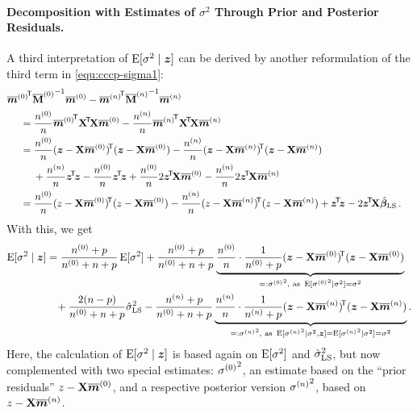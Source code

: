 \paragraph{Decomposition with Estimates of \texorpdfstring{$\sigma^2$}{sigma2} Through Prior and Posterior Residuals.}

A third interpretation of $\operatorname{E}[\sigma^2\mid {\bm z}]$
can be derived by another reformulation of the third term in \eqref{equ:cccp-sigma1}:
\begin{align*}
\lefteqn{
    {\tmz}^\tra {\tMz}^{-1} \tmz
  - {\tmn}^\tra {\tMn}^{-1} \tmn }\hspace*{3ex} \\
&=  \frac{\nz}{n} {\tmz}^\tra \XtX \tmz
  - \frac{\nn}{n} {\tmn}^\tra \XtX \tmn \\
&=  \frac{\nz}{n} (\z - \X\tmz)^\tra (\z - \X\tmz)
  - \frac{\nn}{n} (\z - \X\tmn)^\tra (\z - \X\tmn) \\ & \hspace*{3ex}
  + \frac{\nn}{n} \ztz      - \frac{\nz}{n} \ztz
  + \frac{\nz}{n} 2\ztX\tmz - \frac{\nn}{n} 2\ztX\tmn \\
&=  \frac{\nz}{n} (z - \X\tmz)^\tra (z - \X\tmz)
  - \frac{\nn}{n} (z - \X\tmn)^\tra (z - \X\tmn) %
  + \ztz
  - 2\ztX\bls \,. %
\end{align*}
With this, we get
\begin{align}
\E[\sigma^2\mid \z] &= \frac{\nz + p} {\nz + n + p} \E[\sigma^2]
                      +\frac{\nz + p} {\nz + n + p}
                        \underbrace{\frac{\nz}{n} \cdot \frac{1}{\nz + p}
                                    (\z - \X\tmz)^\tra (\z - \X\tmz)}_{=: {\sigma\uz}^2, \text{ as }
                                                                       \E[{\sigma\uz}^2\mid\sigma^2] = \sigma^2} \nonumber\\ & \hspace*{2ex}
                      +\frac{2(n - p)}{\nz + n + p} \sls
                      -\frac{\nn + p} {\nz + n + p}
                        \underbrace{\frac{\nn}{n} \cdot \frac{1}{\nn + p}
                                    (\z - \X\tmn)^\tra (\z - \X\tmn)}_{=: {\sigma\un}^2, \text{ as }
                                                                       \E[{\sigma\un}^2\mid\sigma^2,\z] = \E[{\sigma\un}^2\mid\sigma^2] = \sigma^2} %
                                                                         .
\label{equ:cccp-sigma3}%
\end{align}
Here, the calculation of $\operatorname{E}[\sigma^2\mid {\bm z}]$ is based
again on $\operatorname{E}[\sigma^2]$ and $\hat{\sigma}^2_\text{LS}$, but now complemented with
two special estimates:
${\sigma^{(0)}}^2$, an estimate based on the ``prior residuals'' $z - \mathbf{X}\overline{{\bm m}}^{(0)}$,
and a respective posterior version ${\sigma^{(n)}}^2$, based on $z - \mathbf{X}\overline{{\bm m}}^{(n)}$.

